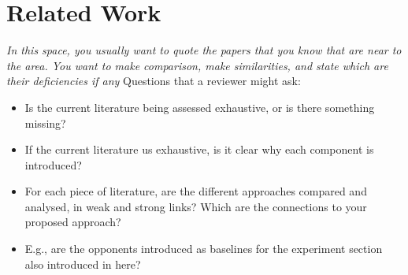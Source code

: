 \section{Related Work}
\textit{In this space, you usually want to quote the papers that you know that are near to the area. You want to make comparison, make similarities, and state which are their deficiencies if any} Questions that a reviewer might ask:
\begin{itemize}
	\item Is the current literature being assessed exhaustive, or is there something missing?
	\item If the current literature us exhaustive, is it clear why each component is introduced?
	\item For each piece of literature, are the different approaches compared and analysed, in weak and strong links? Which are the connections to your proposed approach?
	\item E.g., are the opponents introduced as baselines for the experiment section also introduced in here?
\end{itemize}
